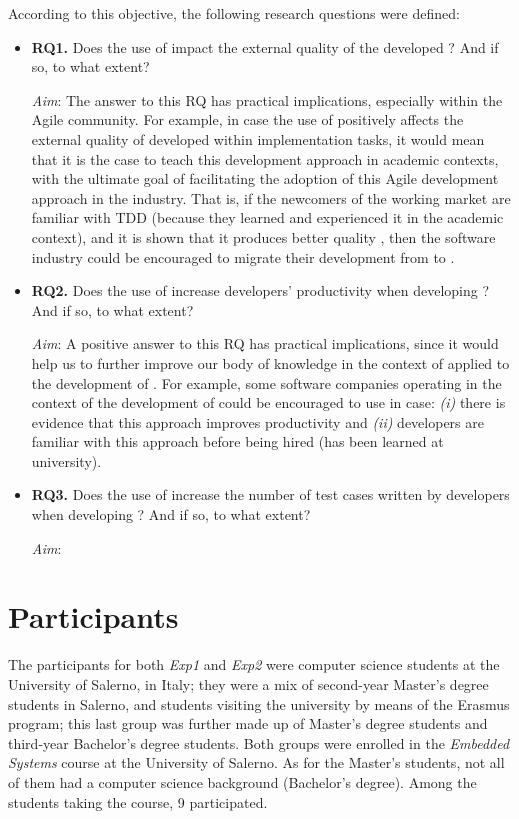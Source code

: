 \noindent According to this objective, the following research questions were defined:
\begin{itemize}
    \item \textbf{RQ1.} Does the use of \tdd impact the external quality of the developed \es? And if so, to what extent?

    \noindent\textit{Aim}: The answer to this RQ has practical implications, especially within the Agile community. For example, in case the use of \tdd positively affects the external quality of \ess developed within implementation tasks, it would mean that it is the case to teach this development approach in academic contexts, with the ultimate goal of facilitating the adoption of this Agile development approach in the industry. That is, if the newcomers of the working market are familiar with TDD (because they learned and experienced it in the academic context), and it is shown that it produces better quality \ess, then the software industry could be encouraged to migrate their development from \notdd to \tdd.

    \item \textbf{RQ2.} Does the use of \tdd increase developers' productivity when developing \ess? And if so, to what extent?

    \noindent\textit{Aim}: A positive answer to this RQ has practical implications, since it would help us to further improve our body of knowledge in the context of \tdd applied to the development of \ess. For example, some software companies operating in the context of the development of \ess could be encouraged to use \tdd in case: \textit{(i)} there is evidence that this approach
    improves productivity and \textit{(ii)} developers are familiar with this approach before being hired (\eg \tdd has been learned at university).

    \item \textbf{RQ3.} Does the use of \tdd increase the number of test cases written by developers when developing \ess? And if so, to what extent?

    \noindent\textit{Aim}: 
\end{itemize}




\section{Participants}
The participants for both \textit{Exp1} and \textit{Exp2} were computer science students at the University of Salerno, in Italy; they were a mix of second-year Master's degree students in Salerno, and students visiting the university by means of the Erasmus program; this last group was further made up of Master's degree students and third-year Bachelor's degree students. Both groups were enrolled in the \textit{Embedded Systems} course at the University of Salerno. As for the Master's students, not all of them had a computer science background (Bachelor's degree). Among the students taking the course, 9 participated. 

